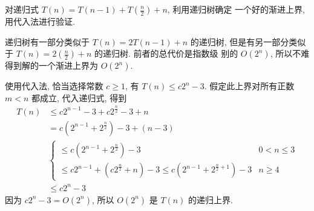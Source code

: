 \documentclass[boxes]{homework}
\begin{document}
\begin{problem}
对递归式 $T(n) = T(n - 1) + T \left( \frac{ n }{ 2 }\right) + n$, 利用递归树确定
一个好的渐进上界, 用代入法进行验证.
\end{problem}
\begin{solution}
    递归树有一部分类似于 $T(n) = 2T(n - 1) + n$ 的递归树, 但是有另一部分类似于
    $T(n) = 2 \left( \frac{ n }{ 2 }\right) + n$ 的递归树. 前者的总代价是指数级
    别的 $O \left( 2^{n}\right)$, 所以不难得到解的一个渐进上界为
    $O \left( 2^{n}\right)$.

    使用代入法, 恰当选择常数 $c \geqslant 1$, 有 $T(n) \leqslant c 2^{n} - 3$.
    假定此上界对所有正数 $m < n$ 都成立, 代入递归式, 得到
    \begin{equation}
        \begin{aligned}
            T(n)
             & \leqslant c 2^{n - 1} - 3 + c 2^{ \frac{ n }{ 2 } } - 3 + n \\
             & = c \left( 2^{n - 1} + 2^{ \frac{ n }{ 2 } }\right) - 3 +
            (n - 3)                                                        \\
             &
            \begin{cases}
                \leqslant \displaystyle
                c \left( 2^{n - 1} + 2^{ \frac{ n }{ 2 } }\right) - 3
                    & 0 < n \leqslant 3 \\
                \leqslant \displaystyle
                c 2^{n - 1} + \left( c 2^{ \frac{ n }{ 2 } } + n\right) - 3
                \leqslant c \left( 2^{n - 1} + 2^{ \frac{ n }{ 2 } + 1}\right)
                - 3 & n \geqslant 4
            \end{cases}
            \\
             & \leqslant c 2^{n} - 3
        \end{aligned}
    \end{equation}
    因为 $c 2^{n} - 3 = O \left( 2^{n}\right)$, 所以 $O \left( 2^{n}\right)$ 是
    $T(n)$ 的递归上界.
\end{solution}
\end{document}
